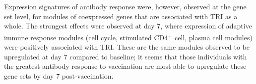 %

Expression signatures of antibody response were, however, observed at the gene set level, for modules of coexpressed genes that are associated with \gls{TRI} as a whole.
The strongest effects were observed at day 7, where expression of adaptive immune response modules (cell cycle, stimulated CD4\textsuperscript{+} cell, plasma cell modules) were positively associated with \gls{TRI}.
These are the same modules observed to be upregulated at day 7 compared to baseline; it seems that those individuals with the greatest antibody response to vaccination are most able to upregulate these gene sets by day 7 post-vaccination.

